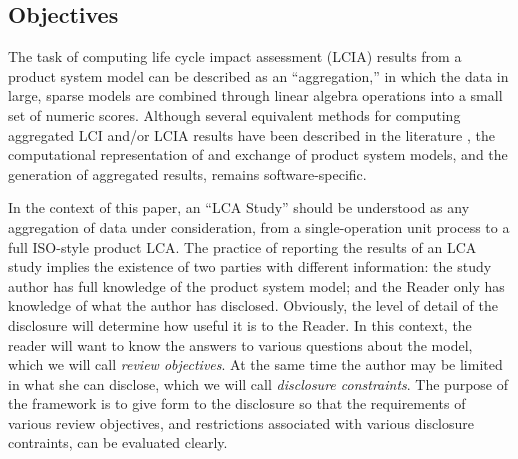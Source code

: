 \subsection{Objectives}

The task of computing life cycle impact assessment (LCIA) results from a product system model can be described as an ``aggregation,'' in which the data in large, sparse models are combined through linear algebra operations into a small set of numeric scores.  Although several equivalent methods for computing aggregated LCI and/or LCIA results have been described in the literature \citep{Suh_2005, Peters_2007}, the computational representation of and exchange of product system models, and the generation of aggregated results, remains software-specific.  

In the context of this paper, an ``LCA Study'' should be understood as any aggregation of data under consideration, from a single-operation unit process to a full ISO-style product LCA.  The practice of reporting the results of an LCA study implies the existence of two parties with different information: the study author has full knowledge of the product system model; and the Reader only has knowledge of what the author has disclosed.  Obviously, the level of detail of the disclosure will determine how useful it is to the Reader.  In this context, the reader will want to know the answers to various questions about the model, which we will call \emph{review objectives}.  
At the same time the author may be limited in what she can disclose, which we will call \emph{disclosure constraints}.  The purpose of the framework is to give form to the disclosure so that the requirements of various review objectives, and restrictions associated with various disclosure contraints, can be evaluated clearly.


